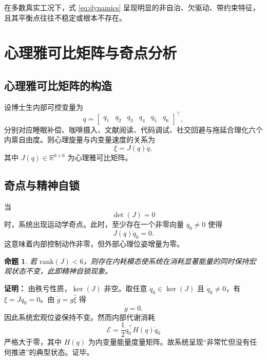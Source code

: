 \documentclass[UTF8,twocolumn,a4paper]{ctexart}
\newtheorem{proposition}{命题}
\begin{document}
在多数真实工况下，式 \eqref{eq:dynamics} 呈现明显的非自治、欠驱动、带约束特征，且其平衡点往往不稳定或根本不存在。

\section{心理雅可比矩阵与奇点分析}

\subsection{心理雅可比矩阵的构造}

设博士生内部可控变量为
\begin{equation}
q=
\begin{bmatrix}
q_1 & q_2 & q_3 & q_4 & q_5 & q_6
\end{bmatrix}^\top,
\end{equation}
分别对应睡眠补偿、咖啡摄入、文献阅读、代码调试、社交回避与拖延合理化六个内禀自由度。则心理旋量与内变量速度的关系为
\begin{equation}
\xi = J(q)\dot{q},
\end{equation}
其中 $J(q)\in\mathbb{R}^{6\times 6}$ 为心理雅可比矩阵。

\subsection{奇点与精神自锁}

当
\begin{equation}
\det(J)=0
\end{equation}
时，系统出现运动学奇点。此时，至少存在一个非零向量 $\dot{q}_0\neq 0$ 使得
\begin{equation}
J(q)\dot{q}_0=0.
\end{equation}
这意味着内部控制动作非零，但外部心理位姿增量为零。

\begin{proposition}
若 $\mathrm{rank}(J)<6$，则存在内耗模态使系统在消耗显著能量的同时保持宏观状态不变，此即精神自锁现象。
\end{proposition}

\noindent\textbf{证明：}
由秩亏性质，$\ker(J)$ 非空。取任意 $\dot{q}_0\in\ker(J)$ 且 $\dot{q}_0\neq 0$，有 $\xi=J\dot{q}_0=0$。由 $\dot{g}=g\hat{\xi}$ 得
\begin{equation}
\dot{g}=0.
\end{equation}
因此系统宏观位姿保持不变。然而内部代谢消耗
\begin{equation}
\mathcal{E}=\frac{1}{2}\dot{q}_0^\top H(q)\dot{q}_0
\end{equation}
严格大于零，其中 $H(q)$ 为内变量能量度量矩阵。故系统呈现“非常忙但没有任何推进”的典型状态。证毕。
\end{document}
